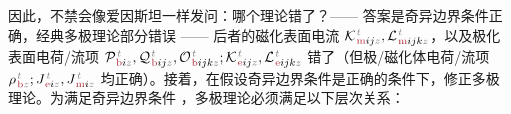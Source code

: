 因此，不禁会像爱因斯坦一样发问：哪个理论错了？—— 答案是奇异边界条件正确，经典多极理论部分错误 —— 后者的磁化表面电流 ${\mathcal{K}}^{\;\!\mathcolor{gray}{t}}_{\;\!\textcolor{Maroon}{\text{m}} ij \mathcolor{gray}{z}},{\mathcal{L}}^{\;\!\mathcolor{gray}{t}}_{\;\!\textcolor{Maroon}{\text{m}} ijk \mathcolor{gray}{z}}$，以及极化表面电荷/流项 ${\mathcal{P}}^{\;\!\mathcolor{gray}{t}}_{\;\!\textcolor{Maroon}{\text{b}} i \mathcolor{gray}{z}},{\mathcal{Q}}^{\;\!\mathcolor{gray}{t}}_{\;\!\textcolor{Maroon}{\text{b}} ij \mathcolor{gray}{z}},{\mathcal{O}}^{\;\!\mathcolor{gray}{t}}_{\;\!\textcolor{Maroon}{\text{b}} ijk \mathcolor{gray}{z}};{\mathcal{K}}^{\;\!\mathcolor{gray}{t}}_{\;\!\textcolor{Maroon}{\text{e}} ij \mathcolor{gray}{z}},{\mathcal{L}}^{\;\!\mathcolor{gray}{t}}_{\;\!\textcolor{Maroon}{\text{e}} ijk \mathcolor{gray}{z}}$ 错了（但极/磁化体电荷/流项 ${\rho}^{\;\!\mathcolor{gray}{t}}_{\;\!\textcolor{Maroon}{\text{b}} \mathcolor{gray}{z}};{J}^{\;\!\mathcolor{gray}{t}}_{\;\!\textcolor{Maroon}{\text{e}} i \mathcolor{gray}{z}},{J}^{\;\!\mathcolor{gray}{t}}_{\;\!\textcolor{Maroon}{\text{m}} i \mathcolor{gray}{z}}$ 均正确）。接着，在假设奇异边界条件是正确的条件下，修正多极理论。为满足奇异边界条件 ，多极理论必须满足以下层次关系：
